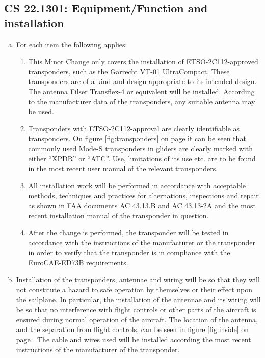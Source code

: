 \documentclass{article}
\begin{document}
\subsection[CS 22.1301]{CS 22.1301:  Equipment/Function and installation}
\begin{enumerate}[(a)]
\item For each item the following applies:
\begin{enumerate}[(1)]
\item This Minor Change only covers the installation of ETSO-2C112-approved transponders, such as the Garrecht VT-01 UltraCompact. These transponders are of a kind and design appropriate to its intended design. The antenna Filser Transflex-4 or equivalent will be installed. According to the manufacturer data of the transponders, any suitable antenna may be used.
\item Transponders with ETSO-2C112-approval are clearly identifiable as transponders. On figure \ref{fig:transponders} on page \pageref{fig:transponders} it can be seen that commonly used Mode-S transponders in gliders are clearly marked with either ``XPDR'' or ``ATC''. Use, limitations of its use etc. are to be found in the most recent user manual of the relevant transponders.
\item All installation work will be performed in accordance with acceptable methods, techniques and practices for alternations, inspections and repair as shown in FAA documents AC 43.13.B and AC 43.13-2A and the most recent installation manual of the transponder in question.
\item After the change is performed, the transponder will be tested in accordance with the instructions of the manufacturer or the transponder in order to verify that the transponder is in compliance with the EuroCAE-ED73B requirements.
\end{enumerate}
\item Installation of the transponders, antennae and wiring will be so that they will not constitute a hazard to safe operation by themselves or their effect upon the sailplane. In particular, the installation of the antennae and its wiring will be so that no interference with flight controls or other parts of the aircraft is ensured during normal operation of the aircraft. The location of the antenna, and the separation from flight controls, can be seen in figure \ref{fig:inside} on page \pageref{fig:inside}. The cable and wires used will be installed according the most recent instructions of the manufacturer of the transponder.
\end{enumerate}
\end{document}
